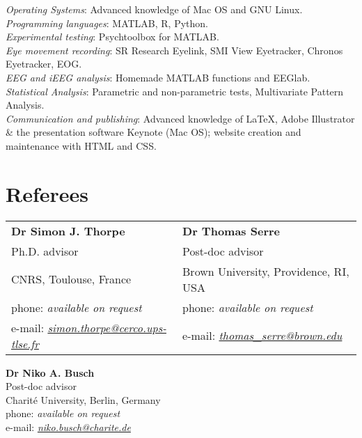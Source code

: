 \documentclass[margin,line]{resume}
\begin{document}
\begin{resume}
	\textsl{Operating Systems}: Advanced knowledge of Mac OS and GNU Linux.\\
	\textsl{Programming languages}: MATLAB, R, Python.\\
	\textsl{Experimental testing}: Psychtoolbox for MATLAB.\\
	\textsl{Eye movement recording}: SR Research Eyelink, SMI View Eyetracker, Chronos Eyetracker, EOG.\\
	\textsl{EEG and iEEG analysis}: Homemade MATLAB functions and EEGlab.\\
	\textsl{Statistical Analysis}: Parametric and non-parametric tests, Multivariate Pattern Analysis.\\
	\textsl{Communication and publishing}: Advanced knowledge of \LaTeX, Adobe Illustrator \& the presentation software Keynote (Mac OS); website creation and maintenance with HTML and CSS.


\newpage	

	\section{\mysidestyle Referees} 

	\begin{tabular}{@{}p{6cm}p{6cm}}
	\textbf{Dr Simon J. Thorpe}       &  \textbf{Dr Thomas Serre}                   \\
	Ph.D. advisor                               &  Post-doc advisor                       \\
	CNRS, Toulouse, France          &  Brown University, Providence, RI, USA        \\
	phone: \textsl{available on request}    &  phone: \textsl{available on request}     \\
	e-mail: \textsl{\href{mailto:simon.thorpe@cerco.ups-tlse.fr}{simon.thorpe@cerco.ups-tlse.fr}}   &  
	e-mail: \textsl{\href{mailto:thomas_serre@brown.edu}{thomas\_serre@brown.edu}}    \\
	\end{tabular}
	
	\textbf{Dr Niko A. Busch} \\
	Post-doc advisor\\
	Charité University, Berlin, Germany \\
	phone: \textsl{available on request} \\
	e-mail: \textsl{\href{mailto:niko.busch@charite.de}{niko.busch@charite.de}} \\

\end{resume}
\end{document}
